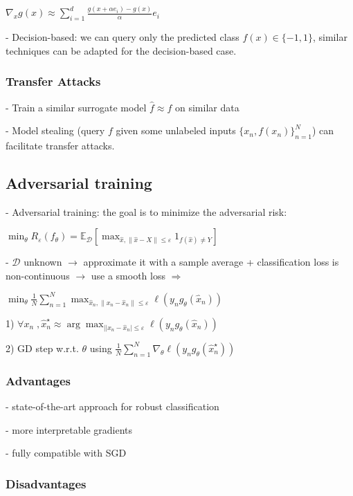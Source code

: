 $\nabla_{x}g(x)\approx\sum_{i=1}^{d}\frac{g(x+\alpha e_{i})-g(x)}{\alpha}e_{i}$

- Decision-based: we can query only the predicted class $f(x) \in \{-1,1\}$, similar techniques can be adapted for the decision-based case.

\subsubsection*{Transfer Attacks}

- Train a similar surrogate model ${\hat{f}}\approx f$ on similar data

- Model stealing (query $f$ given some unlabeled inputs $\{x_{n},f(x_{n})\}_{n=1}^{N}$) can facilitate transfer attacks.


\subsection*{Adversarial training}

- Adversarial training: the goal is to minimize the adversarial risk:

$\operatorname*{min}_{\theta}R_{\varepsilon}(f_{\theta})=\mathbb{E}_{\mathcal{D}}\left[\operatorname*{max}_{\hat{x},\|\hat{x}-X\|\leq\varepsilon}1_{f(\hat{x})\neq Y}\right]$

- $\mathcal{D}$ unknown $\rightarrow$ approximate it with a sample average + classification loss is non-continuous $\rightarrow$ use a smooth loss $\Rightarrow$

$\operatorname*{min}_{\theta}{\frac{1}{N}}\sum_{n=1}^{N} \operatorname*{max}_{\hat{x}_{n},\|x_{n}-\hat{x}_{n}\|\leq\varepsilon}{\ell}(y_{n}g_{\theta}(\hat{x}_{n}))$

1) $\forall x_n\;, \hat{x}_{n}^{\star}\approx\arg\operatorname*{max}_{||x_{n}-\hat{x}_{n}|\leq\varepsilon}\ell(y_{n}g_{\theta}(\hat{x}_{n}))$

2) GD step w.r.t. $\theta$ using $\frac{1}{N}\sum_{n=1}^{N}\nabla_{\theta}{\ell}(y_{n}g_{\theta}({\hat{x}}_{n}^{\star}))$

\subsubsection*{Advantages}

- state-of-the-art approach for robust classification

- more interpretable gradients

- fully compatible with SGD

\subsubsection*{Disadvantages}

